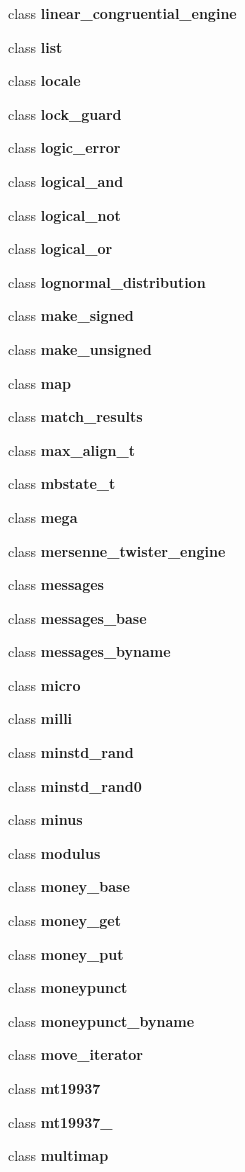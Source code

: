 \begin{DoxyCompactItemize}
class {\bf linear\+\_\+congruential\+\_\+engine}
\item 
class {\bf list}
\item 
class {\bf locale}
\item 
class {\bf lock\+\_\+guard}
\item 
class {\bf logic\+\_\+error}
\item 
class {\bf logical\+\_\+and}
\item 
class {\bf logical\+\_\+not}
\item 
class {\bf logical\+\_\+or}
\item 
class {\bf lognormal\+\_\+distribution}
\item 
class {\bf make\+\_\+signed}
\item 
class {\bf make\+\_\+unsigned}
\item 
class {\bf map}
\item 
class {\bf match\+\_\+results}
\item 
class {\bf max\+\_\+align\+\_\+t}
\item 
class {\bf mbstate\+\_\+t}
\item 
class {\bf mega}
\item 
class {\bf mersenne\+\_\+twister\+\_\+engine}
\item 
class {\bf messages}
\item 
class {\bf messages\+\_\+base}
\item 
class {\bf messages\+\_\+byname}
\item 
class {\bf micro}
\item 
class {\bf milli}
\item 
class {\bf minstd\+\_\+rand}
\item 
class {\bf minstd\+\_\+rand0}
\item 
class {\bf minus}
\item 
class {\bf modulus}
\item 
class {\bf money\+\_\+base}
\item 
class {\bf money\+\_\+get}
\item 
class {\bf money\+\_\+put}
\item 
class {\bf moneypunct}
\item 
class {\bf moneypunct\+\_\+byname}
\item 
class {\bf move\+\_\+iterator}
\item 
class {\bf mt19937}
\item 
class {\bf mt19937\+\_}
\item 
class {\bf multimap}
\item 

\end{DoxyCompactItemize}
